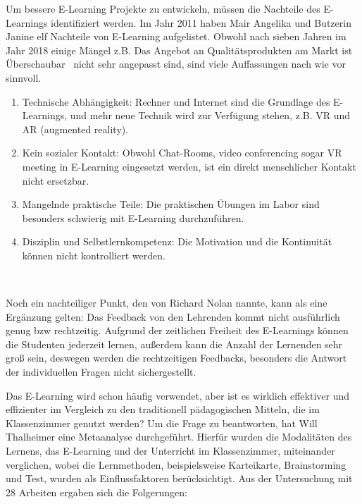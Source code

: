 Um bessere E-Learning Projekte zu entwickeln, müssen die Nachteile des E-Learnings identifiziert werden. Im Jahr 2011 haben Mair Angelika und Butzerin Janine \citep{7} elf Nachteile von E-Learning aufgelistet. Obwohl nach sieben Jahren im Jahr 2018 einige Mängel z.B. \glqq Das Angebot an Qualitätsprodukten am Markt ist Überschaubar \grqq\ nicht sehr angepasst sind, sind viele Auffassungen nach wie vor sinnvoll.

\begin{enumerate}
\item Technische Abhängigkeit: Rechner und Internet sind die Grundlage des E-Learnings, und mehr neue Technik wird zur Verfügung stehen, z.B. VR und AR (augmented reality).
\item Kein sozialer Kontakt: Obwohl Chat-Rooms, video conferencing sogar VR meeting in E-Learning eingesetzt werden, ist ein direkt menschlicher Kontakt nicht ersetzbar.
\item Mangelnde praktische Teile: Die praktischen Übungen im Labor sind besonders schwierig mit E-Learning durchzuführen.
\item Disziplin und Selbstlernkompetenz: Die Motivation und die Kontinuität können nicht kontrolliert werden.
\end{enumerate}\

Noch ein nachteiliger Punkt, den von Richard Nolan \citep{5} nannte, kann als eine Ergänzung gelten: Das Feedback von den Lehrenden kommt nicht ausführlich genug bzw rechtzeitig. Aufgrund der zeitlichen Freiheit des E-Learnings können die Studenten jederzeit lernen, außerdem kann die Anzahl der Lernenden sehr groß sein, deswegen werden die rechtzeitigen Feedbacks, besonders die Antwort der individuellen Fragen nicht sichergestellt.

Das E-Learning wird schon häufig verwendet, aber ist es wirklich effektiver und effizienter im Vergleich zu den traditionell pädagogischen Mitteln, die im Klassenzimmer genutzt werden? Um die Frage zu beantworten, hat Will Thalheimer \citep{8} eine Metaanalyse durchgeführt.
Hierfür wurden die Modalitäten des Lernens, das E-Learning und der Unterricht im Klassenzimmer, miteinander verglichen, wobei die Lernmethoden, beispielsweise Karteikarte, Brainstorming und Test, wurden als Einflussfaktoren berücksichtigt.
Aus der Untersuchung mit 28 Arbeiten ergaben sich die Folgerungen:

